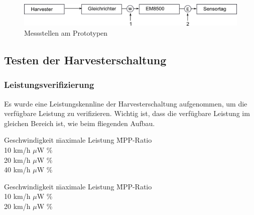 \begin{figure}[ht]
  \includegraphics[width=1.0\textwidth]{3Vorgehen/imag/EnergiemessungStellen.png}               
  \caption{Messstellen am Prototypen}
  \label{EnergieMessungStellen} 
\end{figure}

\subsection{Testen der Harvesterschaltung}
\label{glace}

\subsubsection{Leistungsverifizierung}
\label{leistungsverifizierung}

Es wurde eine Leistungskennline der Harvesterschaltung aufgenommen, um die verfügbare Leistung zu verifizieren. Wichtig ist, dass die verfügbare Leistung im gleichen Bereich ist, wie beim fliegenden Aufbau. 

\begin{minipage}{1\textwidth}
\label{tab:leistung_fliegenden-aufbaus} 
\begin{tabbing}
    Geschwindigkeit   \quad\= maximale Leistung    \quad\= MPP-Ratio\\[0.8ex]
    10 km/h         $\mu$W   \%\\
	20 km/h         $\mu$W   \%\\
	40 km/h         $\mu$W   \%
\end{tabbing}
\end{minipage}

\begin{minipage}{1\textwidth}
\label{tab:leistung_neuen_leiterplatte} 
\begin{tabbing}
    Geschwindigkeit   \quad\= maximale Leistung    \quad\= MPP-Ratio\\[0.8ex]
    10 km/h         $\mu$W   \%\\
	20 km/h         $\mu$W   \%
\end{tabbing}
\end{minipage}

